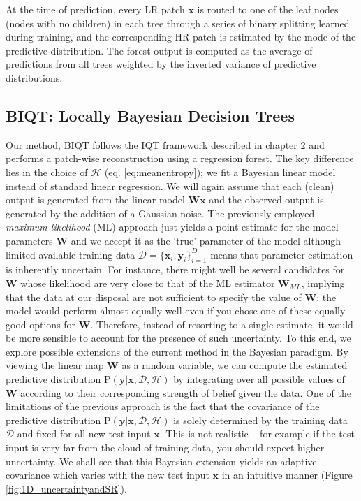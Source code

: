 At the time of prediction, every LR patch $\mathbf{x}$ is routed to one of the leaf nodes (nodes with no children) in each tree through a series of binary splitting learned during training, and the corresponding HR patch is estimated by the mode of the predictive distribution. The forest output is computed as the average of predictions from all trees weighted by the inverted variance of predictive distributions. 


\subsection{BIQT: Locally Bayesian Decision Trees}
Our method, BIQT follows the IQT framework described in chapter $2$ and performs a patch-wise reconstruction using a regression forest. The key difference lies in the choice of $\mathcal{H}$ (eq. \eqref{eq:meanentropy}); we fit a Bayesian linear model \cite{bishop2006pattern} instead of standard linear regression. We will again assume that each (clean) output is generated from the linear model $\mathbf{W}\mathbf{x}$ and the observed output is generated by the addition of a Gaussian noise. The previously employed \textit{maximum likelihood} (ML) approach just yields a point-estimate for the model parameters $\mathbf{W}$ and we accept it as the `true' parameter of the model although limited available training data $\mathcal{D} = \{\textbf{x}_i, \textbf{y}_i\}_{i=1}^D$ means that parameter estimation is inherently uncertain. For instance, there might well be several candidates for $\mathbf{W}$ whose likelihood are very close to that of the ML estimator $\mathbf{W}_{ML}$, implying that the data at our disposal are not sufficient to specify the value of $\mathbf{W}$; the model would perform almost equally well even if you chose one of these equally good options for $\mathbf{W}$. Therefore, instead of resorting to a single estimate, it would be more sensible to account for the presence of such uncertainty. To this end, we explore possible extensions of the current method in the Bayesian paradigm. By viewing the linear map $\mathbf{W}$ as a random variable, we can compute the estimated predictive distribution $\text{P}(\mathbf{y}|\mathbf{x},\mathcal{D},\mathcal{H})$ by integrating over all possible values of $\mathbf{W}$ according to their corresponding strength of belief given the data.  One of the limitations of the previous approach is the fact that the covariance of the predictive distribution $\text{P}(\mathbf{y}|\mathbf{x},\mathcal{D}, \mathcal{H})$ is solely determined by the training data $\mathcal{D}$ and fixed for all new test input $\mathbf{x}$. This is not realistic -- for example if the test input is very far from the cloud of training data, you should expect higher uncertainty. We shall see that this Bayesian extension yields an adaptive covariance which varies with the new test input $\mathbf{x}$ in an intuitive manner (Figure \ref{fig:1D_uncertaintyandSR}). 
	
